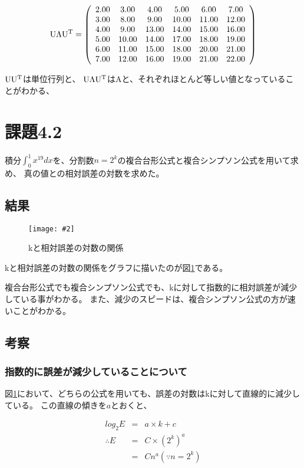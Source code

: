 \documentclass[11pt]{jsarticle}
\newcommand{\fg}[3]{ %
    \begin{figure}
        \centering
        \texttt{[image: \#2]}
        \caption{#3}
        \label{#1}
    \end{figure}
}
\newcommand{\fr}[1]{図\ref{#1}}
\begin{document}
\[
    {\rm U}\Lambda{\rm U}^{\rm T} = 
    \left(\begin{array}{cccccc}
        2.00&3.00&4.00&5.00&6.00&7.00\\
        3.00&8.00&9.00&10.00&11.00&12.00\\
        4.00&9.00&13.00&14.00&15.00&16.00\\
        5.00&10.00&14.00&17.00&18.00&19.00\\
        6.00&11.00&15.00&18.00&20.00&21.00\\
        7.00&12.00&16.00&19.00&21.00&22.00\\
    \end{array}\right)
\]

${\rm U} {\rm U}^{\rm T}$は単位行列と、
${\rm U}\Lambda{\rm U}^{\rm T}$はAと、それぞれほとんど等しい値となっていることがわかる、

\section{課題4.2}
積分$ \int^{1}_{0} x^{19} dx $を、分割数$n = 2 ^ k$の複合台形公式と複合シンプソン公式を用いて求め、
真の値との相対誤差の対数を求めた。

\subsection{結果}
\fg{fig2}{graph/4_2.png}{kと相対誤差の対数の関係}
kと相対誤差の対数の関係をグラフに描いたのが\fr{fig2}である。

複合台形公式でも複合シンプソン公式でも、kに対して指数的に相対誤差が減少している事がわかる。
また、減少のスピードは、複合シンプソン公式の方が速いことがわかる。

\subsection{考察}
\subsubsection{指数的に誤差が減少していることについて}

\fr{fig2}において、どちらの公式を用いても、誤差の対数はkに対して直線的に減少している。
この直線の傾きを$a$とおくと、

\begin{eqnarray*}
    log_2 E & = & a \times k + c \\
    \therefore E & = & C \times (2^k)^a \\
                 & = & C n^a (\because n = 2 ^ k)
\end{eqnarray*}
\end{document}
